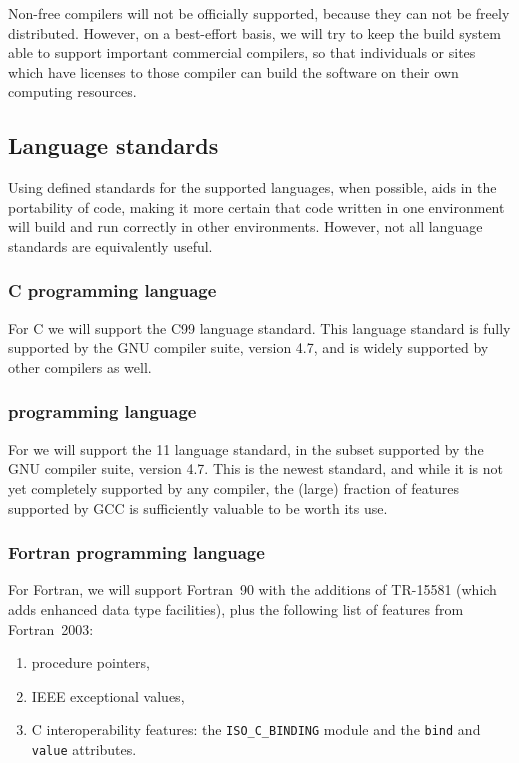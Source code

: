\documentclass[draftmode,draftwater]{memarticle}
\begin{document}
Non-free compilers will not be officially supported, because they can
not be freely distributed. However, on a best-effort basis, we will try
to keep the build system able to support important commercial compilers,
so that individuals or sites which have licenses to those compiler can
build the software on their own computing resources.

\subsection{Language standards}

Using defined standards for the supported languages, when possible, aids
in the portability of code, making it more certain that code written in
one environment will build and run correctly in other environments.
However, not all language standards are equivalently useful.

\subsubsection{C programming language}

For C we will support the C99 language standard. This language standard
is fully supported by the GNU compiler suite, version 4.7, and is widely
supported by other compilers as well.

\subsubsection{\cpp{} programming language}

For \cpp{} we will support the \cpp{}11 language standard, in the subset
supported by the GNU compiler suite, version 4.7. This is the newest
\cpp{} standard, and while it is not yet completely supported by any
compiler, the (large) fraction of features supported by GCC is
sufficiently valuable to be worth its use.

\subsubsection{Fortran programming language}

For Fortran, we will support Fortran~90 with the additions of TR-15581
(which adds enhanced data type facilities), plus the following list of
features from Fortran~2003:
\begin{enumerate}
\item procedure pointers,
\item IEEE exceptional values,
\item C interoperability features: the \texttt{ISO\_C\_BINDING} module
  and the \texttt{bind} and \texttt{value} attributes.
\end{enumerate}
\end{document}
